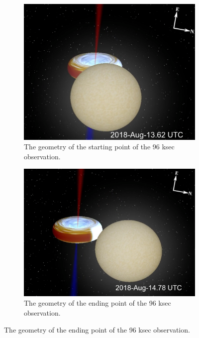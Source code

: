\begin{figure}[h!]
    \centering
    \begin{subfigure}[t]{.4\textwidth}
        \centering
        \includegraphics[width=0.94\linewidth]{Chapters/Figures/video_long.png}
        \caption{The geometry of the starting point of the 96 ksec observation.}
        \label{video_long1}
    \end{subfigure}%
    \hspace*{4em}
    \begin{subfigure}[t]{.4\textwidth}
        \centering
        \includegraphics[width=\linewidth]{Chapters/Figures/video_long2.png}
        \caption{The geometry of the ending point of the 96 ksec observation.}
        \label{video_long2}
    \end{subfigure}
    \label{video_long}
\end{figure}




